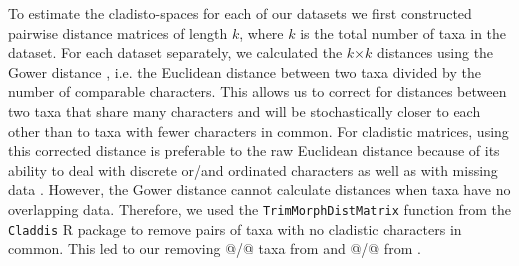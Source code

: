 \documentclass[12pt,letterpaper]{article}
\renewcommand{\subsubsection}[1]{%
\vspace{2ex}
\noindent
\textit{#1.}---}
\begin{document}


To estimate the cladisto-spaces for each of our datasets we first constructed pairwise distance matrices of length $k$, where $k$ is the total number of taxa in the dataset. 
For each dataset separately, we calculated the $k$$\times$$k$ distances using the Gower distance \citep{Gower71}, i.e. the Euclidean distance between two taxa divided by the number of comparable
characters. 
This allows us to correct for distances between two taxa that share many characters and will be stochastically closer %
to each other than to taxa with fewer characters in common.
For cladistic matrices, using this corrected distance is preferable to the raw Euclidean distance because of its ability to deal with discrete or/and ordinated characters as well as with missing data \citep{anderson2012using}.
However, the Gower distance cannot calculate distances when taxa have no overlapping data.
Therefore, we used the \texttt{TrimMorphDistMatrix} function from the \texttt{Claddis} R package \citep{Claddis} to remove pairs of taxa with no cladistic characters in common.
This led to our removing @/@ taxa from \cite{Slater2012MEE} and @/@ from \cite{beckancient2014}.
\end{document}
